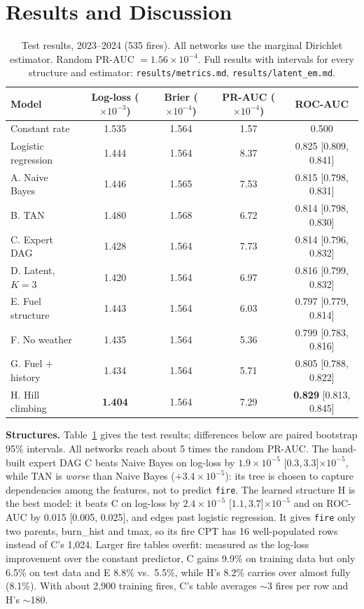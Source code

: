 \documentclass[11pt]{article}
\begin{document}
\section{Results and Discussion}
\label{sec:results}

\begin{table}[htb]
\centering
\small
\begin{tabular}{lcccc}
\toprule
Model & Log-loss ($\times10^{-3}$) & Brier ($\times10^{-4}$) & PR-AUC ($\times10^{-4}$) & ROC-AUC \\
\midrule
Constant rate & 1.535 & 1.564 & 1.57 & 0.500 \\
Logistic regression & 1.444 & 1.564 & 8.37 & 0.825 [0.809, 0.841] \\
A. Naive Bayes & 1.446 & 1.565 & 7.53 & 0.815 [0.798, 0.831] \\
B. TAN & 1.480 & 1.568 & 6.72 & 0.814 [0.798, 0.830] \\
C. Expert DAG & 1.428 & 1.564 & 7.73 & 0.814 [0.796, 0.832] \\
D. Latent, $K=3$ & 1.420 & 1.564 & 6.97 & 0.816 [0.799, 0.832] \\
E. Fuel structure & 1.443 & 1.564 & 6.03 & 0.797 [0.779, 0.814] \\
F. No weather & 1.435 & 1.564 & 5.36 & 0.799 [0.783, 0.816] \\
G. Fuel + history & 1.434 & 1.564 & 5.71 & 0.805 [0.788, 0.822] \\
H. Hill climbing & \textbf{1.404} & 1.564 & 7.29 & \textbf{0.829} [0.813, 0.845] \\
\bottomrule
\end{tabular}
\caption{Test results, 2023--2024 (535 fires). All networks use the marginal Dirichlet estimator.
Random PR-AUC $=1.56\times10^{-4}$. Full results with intervals for every structure and estimator:
\texttt{results/metrics.md}, \texttt{results/latent\_em.md}.}
\label{tab:metrics}
\end{table}

\textbf{Structures.} Table~\ref{tab:metrics} gives the test results; differences below are
paired bootstrap 95\% intervals. All networks reach about 5 times the random PR-AUC. The hand-built
expert DAG C beats Naive Bayes on log-loss by $1.9\times10^{-5}$ [$0.3, 3.3$]$\times10^{-5}$, while TAN
is \emph{worse} than Naive Bayes ($+3.4\times10^{-5}$): its tree is chosen to capture dependencies
among the features, not to predict \texttt{fire}. The learned structure H is the best model: it beats C
on log-loss by $2.4\times10^{-5}$ [$1.1, 3.7$]$\times10^{-5}$ and on ROC-AUC by 0.015 [0.005, 0.025],
and edges past logistic regression. It gives \texttt{fire} only two parents, burn\_hist and tmax, so
its fire CPT has 16 well-populated rows instead of C's 1,024. Larger fire tables overfit:
measured as the log-loss improvement over the constant predictor, C gains 9.9\% on training data
but only 6.5\% on test data and E 8.8\% vs.\ 5.5\%, while H's 8.2\% carries over almost fully
(8.1\%). With about 2,900 training fires, C's table averages $\sim$3 fires per row and H's $\sim$180.
\end{document}
